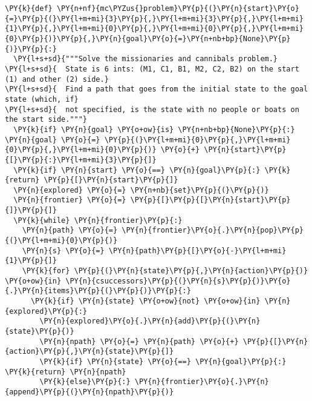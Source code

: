 \begin{Verbatim}[commandchars=\\\{\}]
\PY{k}{def} \PY{n+nf}{mc\PYZus{}problem}\PY{p}{(}\PY{n}{start}\PY{o}{=}\PY{p}{(}\PY{l+m+mi}{3}\PY{p}{,}\PY{l+m+mi}{3}\PY{p}{,}\PY{l+m+mi}{1}\PY{p}{,}\PY{l+m+mi}{0}\PY{p}{,}\PY{l+m+mi}{0}\PY{p}{,}\PY{l+m+mi}{0}\PY{p}{)}\PY{p}{,}\PY{n}{goal}\PY{o}{=}\PY{n+nb+bp}{None}\PY{p}{)}\PY{p}{:}
  \PY{l+s+sd}{"""Solve the missionaries and cannibals problem.}
\PY{l+s+sd}{  State is 6 ints: (M1, C1, B1, M2, C2, B2) on the start (1) and other (2) side.}
\PY{l+s+sd}{  Find a path that goes from the initial state to the goal state (which, if}
\PY{l+s+sd}{  not specified, is the state with no people or boats on the start side."""}
  \PY{k}{if} \PY{n}{goal} \PY{o+ow}{is} \PY{n+nb+bp}{None}\PY{p}{:} \PY{n}{goal} \PY{o}{=} \PY{p}{(}\PY{l+m+mi}{0}\PY{p}{,}\PY{l+m+mi}{0}\PY{p}{,}\PY{l+m+mi}{0}\PY{p}{)} \PY{o}{+} \PY{n}{start}\PY{p}{[}\PY{p}{:}\PY{l+m+mi}{3}\PY{p}{]}
  \PY{k}{if} \PY{n}{start} \PY{o}{==} \PY{n}{goal}\PY{p}{:} \PY{k}{return} \PY{p}{[}\PY{n}{start}\PY{p}{]}
  \PY{n}{explored} \PY{o}{=} \PY{n+nb}{set}\PY{p}{(}\PY{p}{)}
  \PY{n}{frontier} \PY{o}{=} \PY{p}{[}\PY{p}{[}\PY{n}{start}\PY{p}{]}\PY{p}{]}
  \PY{k}{while} \PY{n}{frontier}\PY{p}{:}
    \PY{n}{path} \PY{o}{=} \PY{n}{frontier}\PY{o}{.}\PY{n}{pop}\PY{p}{(}\PY{l+m+mi}{0}\PY{p}{)}
    \PY{n}{s} \PY{o}{=} \PY{n}{path}\PY{p}{[}\PY{o}{-}\PY{l+m+mi}{1}\PY{p}{]}
    \PY{k}{for} \PY{p}{(}\PY{n}{state}\PY{p}{,}\PY{n}{action}\PY{p}{)} \PY{o+ow}{in} \PY{n}{csuccessors}\PY{p}{(}\PY{n}{s}\PY{p}{)}\PY{o}{.}\PY{n}{items}\PY{p}{(}\PY{p}{)}\PY{p}{:}
      \PY{k}{if} \PY{n}{state} \PY{o+ow}{not} \PY{o+ow}{in} \PY{n}{explored}\PY{p}{:}
        \PY{n}{explored}\PY{o}{.}\PY{n}{add}\PY{p}{(}\PY{n}{state}\PY{p}{)}
        \PY{n}{npath} \PY{o}{=} \PY{n}{path} \PY{o}{+} \PY{p}{[}\PY{n}{action}\PY{p}{,}\PY{n}{state}\PY{p}{]}
        \PY{k}{if} \PY{n}{state} \PY{o}{==} \PY{n}{goal}\PY{p}{:} \PY{k}{return} \PY{n}{npath}
        \PY{k}{else}\PY{p}{:} \PY{n}{frontier}\PY{o}{.}\PY{n}{append}\PY{p}{(}\PY{n}{npath}\PY{p}{)}
 

\end{Verbatim}
